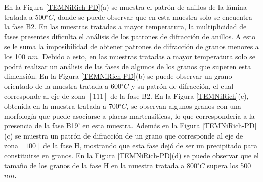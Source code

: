 \documentclass[12pt]{article}
\theoremstyle{definition}
\theoremstyle{remark}
\begin{document}
{En la Figura \ref{TEMNiRich-PD}(a) se muestra el patrón de anillos de la lámina tratada a 500$^\circ C$, donde se puede observar que en esta muestra solo se encuentra la fase B2. En las muestras tratadas a mayor temperatura, la multiplicidad de fases presentes dificulta el análisis de los patrones de difracción de anillos. A esto se le suma la imposibilidad de obtener patrones de difracción de granos menores a los 100 $nm$. Debido a esto, en las muestras tratadas a mayor temperatura solo se podrá realizar un análisis de las fases de algunos de los granos que superen esta dimensión. En la Figura \ref{TEMNiRich-PD}(b) se puede observar un grano orientado de la muestra tratada a 600$^\circ C$ y su patrón de difracción, el cual corresponde al eje de zona $[111]$ de la fase B2. En la Figura \ref{TEMNiRich}(c), obtenida en la muestra tratada a 700$^\circ C$, se observan algunos granos con una morfología que puede asociarse a placas martensíticas, lo que correspondería a la presencia de la fase B19' en esta muestra. Además en la Figura \ref{TEMNiRich-PD}(c) se muestra un patrón de difracción de un grano que corresponde al eje de zona $[100]$ de la fase H, mostrando que esta fase dejó de ser un precipitado para constituirse en granos. En la Figura \ref{TEMNiRich-PD}(d) se puede observar que el tamaño de los granos de la fase H en la muestra tratada a 800$^\circ C$ supera los 500 $nm$.

}
\end{document}
